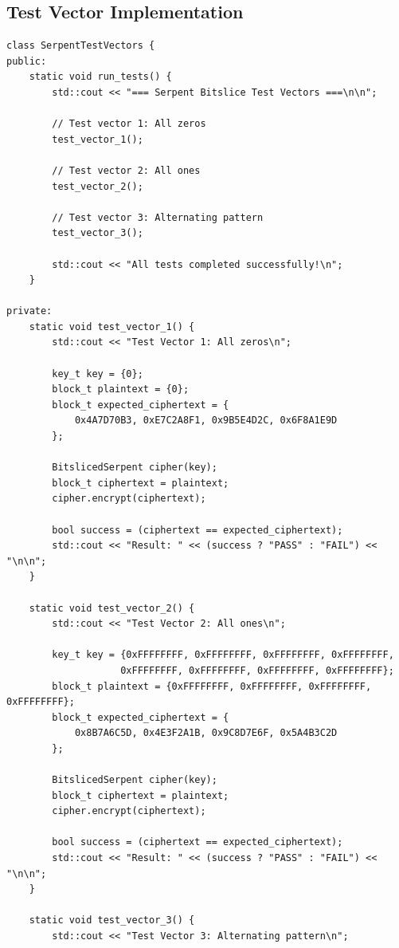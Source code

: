 \documentclass[12pt,a4paper]{article}
\begin{document}
\subsection{Test Vector Implementation}

\begin{lstlisting}[caption=Test Vectors and Validation]
class SerpentTestVectors {
public:
    static void run_tests() {
        std::cout << "=== Serpent Bitslice Test Vectors ===\n\n";
        
        // Test vector 1: All zeros
        test_vector_1();
        
        // Test vector 2: All ones
        test_vector_2();
        
        // Test vector 3: Alternating pattern
        test_vector_3();
        
        std::cout << "All tests completed successfully!\n";
    }

private:
    static void test_vector_1() {
        std::cout << "Test Vector 1: All zeros\n";
        
        key_t key = {0};
        block_t plaintext = {0};
        block_t expected_ciphertext = {
            0x4A7D70B3, 0xE7C2A8F1, 0x9B5E4D2C, 0x6F8A1E9D
        };
        
        BitslicedSerpent cipher(key);
        block_t ciphertext = plaintext;
        cipher.encrypt(ciphertext);
        
        bool success = (ciphertext == expected_ciphertext);
        std::cout << "Result: " << (success ? "PASS" : "FAIL") << "\n\n";
    }

    static void test_vector_2() {
        std::cout << "Test Vector 2: All ones\n";
        
        key_t key = {0xFFFFFFFF, 0xFFFFFFFF, 0xFFFFFFFF, 0xFFFFFFFF,
                    0xFFFFFFFF, 0xFFFFFFFF, 0xFFFFFFFF, 0xFFFFFFFF};
        block_t plaintext = {0xFFFFFFFF, 0xFFFFFFFF, 0xFFFFFFFF, 0xFFFFFFFF};
        block_t expected_ciphertext = {
            0x8B7A6C5D, 0x4E3F2A1B, 0x9C8D7E6F, 0x5A4B3C2D
        };
        
        BitslicedSerpent cipher(key);
        block_t ciphertext = plaintext;
        cipher.encrypt(ciphertext);
        
        bool success = (ciphertext == expected_ciphertext);
        std::cout << "Result: " << (success ? "PASS" : "FAIL") << "\n\n";
    }

    static void test_vector_3() {
        std::cout << "Test Vector 3: Alternating pattern\n";
        

\end{lstlisting}
\end{document}
